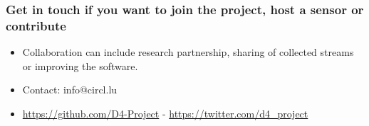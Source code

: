 \documentclass{beamer}
\begin{document}
\begin{frame}
\frametitle{Get in touch if you want to join the project, host a sensor or contribute}
\begin{itemize}
\item Collaboration can include research partnership, sharing of collected streams or improving the software.
\item Contact: info@circl.lu
\item \url{https://github.com/D4-Project} -  \url{https://twitter.com/d4_project}
\end{itemize}
\end{frame}
\end{document}
